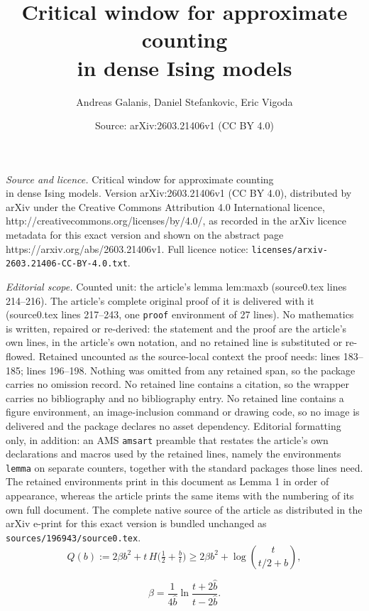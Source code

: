 \documentclass[10pt,a4paper]{amsart}
\title{Critical window for approximate counting\\ in dense Ising models}
\author{Andreas Galanis, Daniel Stefankovic, Eric Vigoda}
\date{Source: arXiv:2603.21406v1 (CC BY 4.0)}
\begin{document}
\maketitle

\noindent\emph{Source and licence.} Critical window for approximate counting\\ in dense Ising models. Version arXiv:2603.21406v1 (CC BY 4.0), distributed by arXiv under the Creative Commons Attribution 4.0 International licence, http://creativecommons.org/licenses/by/4.0/, as recorded in the arXiv licence metadata for this exact version and shown on the abstract page https://arxiv.org/abs/2603.21406v1. Full licence notice: \texttt{licenses/arxiv-2603.21406-CC-BY-4.0.txt}.\par\smallskip

\noindent\textit{Editorial scope.} Counted unit: the article's lemma lem:maxb (source0.tex lines 214--216). The article's complete original proof of it is delivered with it (source0.tex lines 217--243, one \texttt{proof} environment of 27 lines). No mathematics is written, repaired or re-derived: the statement and the proof are the article's own lines, in the article's own notation, and no retained line is substituted or re-flowed.  Retained uncounted as the source-local context the proof needs: lines 183--185; lines 196--198.  Nothing was omitted from any retained span, so the package carries no omission record.  No retained line contains a citation, so the wrapper carries no bibliography and no bibliography entry.  No retained line contains a figure environment, an image-inclusion command or drawing code, so no image is delivered and the package declares no asset dependency.  Editorial formatting only, in addition: an AMS \texttt{amsart} preamble that restates the article's own declarations and macros used by the retained lines, namely the environments \texttt{lemma} on separate counters, together with the standard packages those lines need.  The retained environments print in this document as Lemma 1 in order of appearance, whereas the article prints the same items with the numbering of its own full document.  The complete native source of the article as distributed in the arXiv e-print for this exact version is bundled unchanged as \texttt{sources/196943/source0.tex}.
\begin{equation}\label{ZOB}
Q(b):= 2\beta b^2 + t\, H\big(\tfrac{1}{2} + \tfrac{b}{t}\big) \geq  2\beta b^2 + \log {t\choose t/2 + b},
\end{equation}

\begin{equation}\label{e1}
\beta = \frac{1}{4\hat{b}}\ln \frac{t + 2\hat{b}}{t - 2\hat{b}}.
\end{equation}
\end{document}
